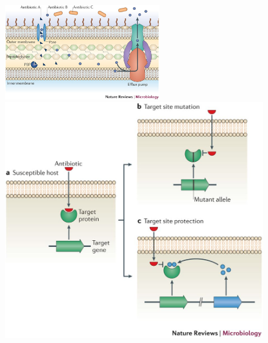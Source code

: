 \begin{figure}[h]
\begin{center}
\includegraphics[width = 0.6\textwidth]{pics/amr1}
\vspace{0.8cm}
\includegraphics[height = 0.36\textheight]{pics/amr3}
\hspace{0.5cm}

\end{center}
\end{figure}

